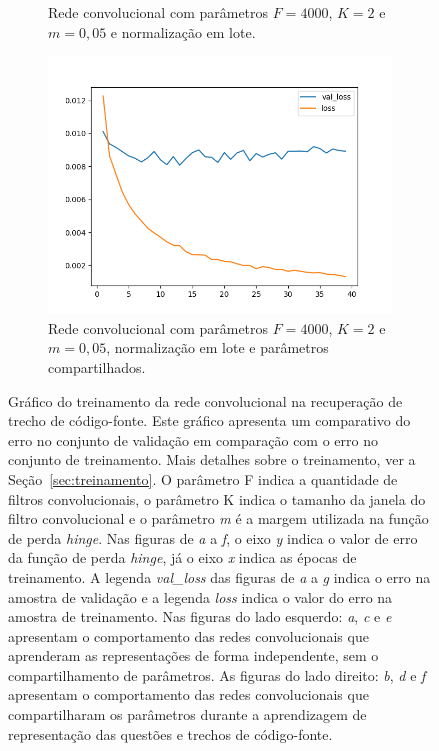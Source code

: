 \begin{figure}[H]
\begin{subfigure}{.5\textwidth}
  \caption{Rede convolucional com parâmetros $F = 4000$, $K = 2$ e $m = 0,05$ e normalização em lote.}
  \label{fig:cnn-4000-k-2-m-005-normalizacao-em-lote-v2}
\end{subfigure}
\begin{subfigure}{.5\textwidth}
  \centering
  \includegraphics[width=.8\linewidth]{figuras/ape-ajustes-hiper-parametros/shared-cnn-with-bn-4000-k-2-m-005.png}
  \caption{Rede convolucional com parâmetros $F = 4000$, $K = 2$ e $m = 0,05$, normalização em lote e parâmetros compartilhados.}
  \label{fig:shared-cnn-4000-k-2-m-005-normalizacao-em-lote}
\end{subfigure}

\caption{Gráfico do treinamento da rede convolucional na recuperação de trecho de código-fonte. Este gráfico apresenta um comparativo do erro no conjunto de validação em comparação com o erro no conjunto de treinamento. Mais detalhes sobre o treinamento, ver a Seção~\ref{sec:treinamento}. O parâmetro F indica a quantidade de filtros convolucionais, o parâmetro K indica o tamanho da janela do filtro convolucional e o parâmetro \emph{m} é a margem utilizada na função de perda \textit{hinge}. Nas figuras de \emph{a} a \emph{f}, o eixo \emph{y} indica o valor de erro da função de perda \textit{hinge}, já o eixo \emph{x} indica as épocas de treinamento. A legenda \emph{val\_loss} das figuras de \emph{a} a \emph{g} indica o erro na amostra de validação e a legenda \emph{loss} indica o valor do erro na amostra de treinamento. Nas figuras do lado esquerdo: \emph{a}, \emph{c} e \emph{e} apresentam o comportamento das redes convolucionais que aprenderam as representações de forma independente, sem o compartilhamento de parâmetros. As figuras do lado direito: \emph{b}, \emph{d} e \emph{f} apresentam o comportamento das redes convolucionais que compartilharam os parâmetros durante a aprendizagem de representação das questões e trechos de código-fonte. }
\label{fig:treinamento-shared-cnn}
\end{figure}

